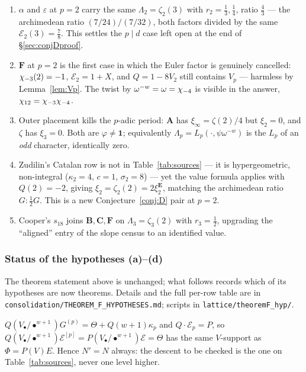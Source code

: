 \begin{remark}
\begin{enumerate}[leftmargin=1.6em]
\item $\alpha$ and $\varepsilon$ at $p=2$ carry the same $\Lambda_2=\zeta_2(3)$
with $r_2=\tfrac13,\tfrac14$, ratio $\tfrac43$ --- the archimedean ratio
$(7/24)/(7/32)$, both factors divided by the same $\mathcal E_2(3)=\tfrac78$.
This settles the $p\mid d$ case left open at the end of \S\ref{sec:conjDproof}.
\item $\mathbf F$ at $p=2$ is the first case in which the Euler factor is
genuinely cancelled: $\chi_{-3}(2)=-1$, $\mathcal E_2=1+X$, and $Q=1-8V_2$ still
contains $V_p$ --- harmless by Lemma~\ref{lem:Vp}.  The twist by
$\omega^{-w}=\omega=\chi_{-4}$ is visible in the answer, $\chi_{12}=\chi_{-3}\chi_{-4}$.
\item Outer placement kills the $p$-adic period: $\mathbf A$ has
$\xi_\infty=\zeta(2)/4$ but $\xi_2=0$, and $\zeta$ has $\xi_3=0$.  Both are
$\varphi\neq\mathbf 1$; equivalently $\Lambda_p=L_p(\cdot,\psi\omega^{-w})$ is
the $L_p$ of an \emph{odd} character, identically zero.
\item Zudilin's Catalan row is not in Table~\ref{tab:sources} --- it is
hypergeometric, non-integral ($\kappa_2=4$, $c=1$, $\sigma_2=8$) --- yet the
value formula applies with $Q(2)=-2$, giving $\xi_2=\zeta_2(2)=2\xi_2^{\mathbf E}$,
matching the archimedean ratio $G:\tfrac12G$.  This is a new
Conjecture~\ref{conj:D} pair at $p=2$.
\item Cooper's $s_{18}$ joins $\mathbf B,\mathbf C,\mathbf F$ on
$\Lambda_3=\zeta_3(2)$ with $r_3=\tfrac12$, upgrading the ``aligned'' entry of
the slope census to an identified value.
\end{enumerate}
\end{remark}

\subsubsection*{Status of the hypotheses \textup{(a)}--\textup{(d)}}

The theorem statement above is unchanged; what follows records which of its
hypotheses are now theorems.  Details and the full per-row table are in
\texttt{consolidation/THEOREM\_F\_HYPOTHESES.md}; scripts in
\texttt{lattice/theoremF\_hyp/}.

\begin{lemma}\label{lem:levelN}
\Proved{} $Q(V_\bullet/\bullet^{w+1})G^{(p)}=\Theta+Q(w+1)\kappa_p$ and
$Q\cdot\mathcal E_p=P$, so
$Q(V_\bullet/\bullet^{w+1})\mathcal E^{[p]}=P(V_\bullet/\bullet^{w+1})\mathcal E
=\Theta$ has the same $V$-support as $\Phi=P(V)E$.  Hence $N'=N$ always: the
descent to be checked is the one on Table~\ref{tab:sources}, never one level
higher.
\end{lemma}

